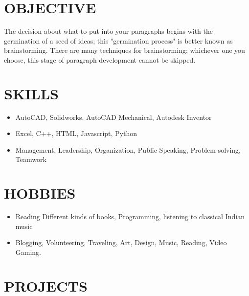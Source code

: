 \documentclass{article}
\begin{document}
\section*{\large{\uppercase{objective}}}

\vspace{3pt}
The decision about what to put into your paragraphs begins with the germination of a seed of ideas; this "germination process" is better known as brainstorming. There are many techniques for brainstorming; whichever one you choose, this stage of paragraph development cannot be skipped. 
\vspace{3pt}

\section*{\large{\uppercase{Skills}}}

\vspace{3pt}
\begin{itemize}[noitemsep,nolistsep]
	\item AutoCAD, Solidworks, AutoCAD Mechanical, Autodesk Inventor
	\item Excel, C++, HTML, Javascript, Python
	\item Management, Leadership, Organization, Public Speaking, Problem-solving, Teamwork
\end{itemize}
\vspace{3pt}

\section*{\large{\uppercase{Hobbies}}}

\vspace{3pt}
\begin{itemize}[noitemsep,nolistsep]
	\item Reading Different kinds of books, Programming, listening to classical Indian music
	\item Blogging, Volunteering, Traveling, Art, Design, Music, Reading, Video Gaming.
\end{itemize}

\vspace{3pt}
\section*{\large{\uppercase{projects}}}
\end{document}
